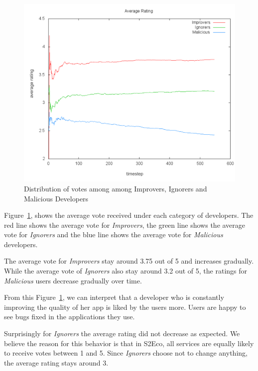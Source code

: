\begin{figure}[!htb]
  \centering
  \includegraphics[width=13.5cm]{figures/votes_distribution_segregated.pdf}
  \caption{Distribution of votes among among Improvers, Ignorers and Malicious Developers}
  \label{fig:votes_distribution_segregated}
\end{figure}

Figure~\ref{fig:votes_distribution_segregated}, shows the average vote received under each category of developers. The red line shows the average vote for \emph{Improvers}, the green line shows the average vote for \emph{Ignorers} and the blue line shows the average vote for \emph{Malicious} developers.

The average vote for \emph{Improvers} stay around 3.75 out of 5 and increases gradually. While the average vote of \emph{Ignorers} also stay around 3.2 out of 5, the ratings for \emph{Malicious} users decrease gradually over time.

From this Figure~\ref{fig:votes_distribution_segregated}, we can interpret that a developer who is constantly improving the quality of her app is liked by the users more. Users are happy to see bugs fixed in the applications they use. 

Surprisingly for \emph{Ignorers} the average rating did not decrease as expected. We believe the reason for this behavior is that in S2Eco, all services are equally likely to receive votes between 1 and 5. Since \emph{Ignorers} choose not to change anything, the average rating stays around 3.

